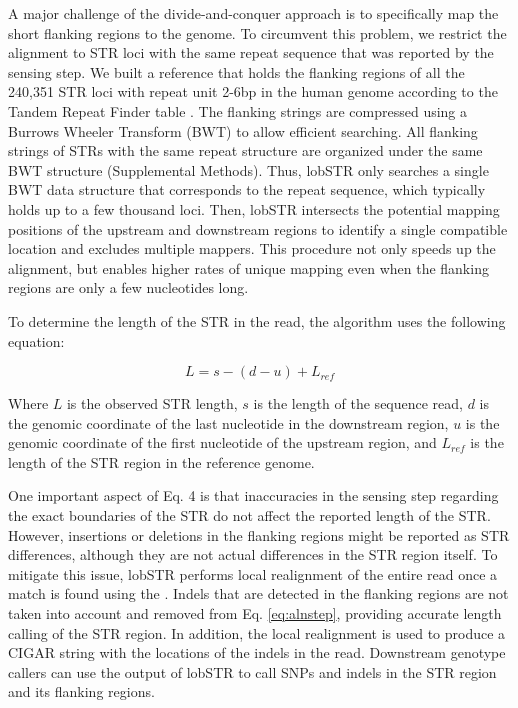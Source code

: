 {A major challenge of the divide-and-conquer approach is to specifically map the short flanking regions to the genome. To circumvent this problem, we restrict the alignment to STR loci with the same repeat sequence that was reported by the sensing step. We built a reference that holds the flanking regions of all the 240,351 STR loci with repeat unit 2-6bp in the human genome according to the Tandem Repeat Finder table \cite{Benson1999}. The flanking strings are compressed using a Burrows Wheeler Transform \cite{BurrowsWheeler1994} (BWT) to allow efficient searching. All flanking strings of STRs with the same repeat structure are organized under the same BWT structure (Supplemental Methods). Thus, lobSTR only searches a single BWT data structure that corresponds to the repeat sequence, which typically holds up to a few thousand loci. Then, lobSTR intersects the potential mapping positions of the upstream and downstream regions to identify a single compatible location and excludes multiple mappers. This procedure not only speeds up the alignment, but enables higher rates of unique mapping even when the flanking regions are only a few nucleotides long. 

To determine the length of the STR in the read, the algorithm uses the following equation: 

\begin{equation} \label{eq:alnstep}
L = s - (d - u ) + L_{ref}                                                                  
\end{equation}

Where $L$ is the observed STR length, $s$ is the length of the sequence read, $d$ is the genomic coordinate of the last nucleotide in the downstream region, $u$ is the genomic coordinate of the first nucleotide of the upstream region, and $L_{ref}$ is the length of the STR region in the reference genome. 

One important aspect of Eq. 4 is that inaccuracies in the sensing step regarding the exact boundaries of the STR do not affect the reported length of the STR. However, insertions or deletions in the flanking regions might be reported as STR differences, although they are not actual differences in the STR region itself. To mitigate this issue, lobSTR performs local realignment of the entire read once a match is found using the \cite{NeedlemanWunsch1970}. Indels that are detected in the flanking regions are not taken into account and removed from Eq. \ref{eq:alnstep}, providing accurate length calling of the STR region. In addition, the local realignment is used to produce a CIGAR string with the locations of the indels in the read. Downstream genotype callers can use the output of lobSTR to call SNPs and indels in the STR region and its flanking regions. 

}
